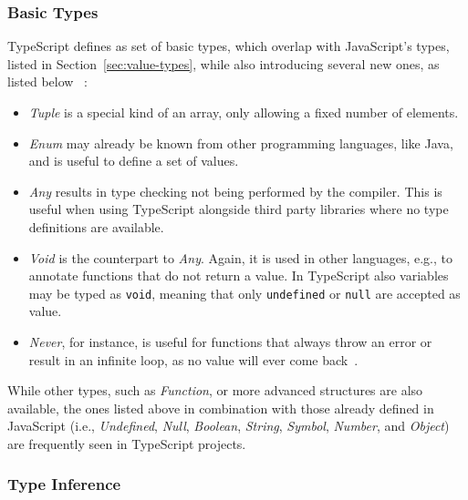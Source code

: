 \subsubsection{Basic Types}

TypeScript defines as set of basic types, which overlap with JavaScript's types, listed in Section~\ref{sec:value-types}, while also introducing several new ones, as listed below ~\cite{TypeScriptHandbook:BasicTypes}:
\begin{itemize}
  \item \emph{Tuple} is a special kind of an array, only allowing a fixed number of elements.
  \item \emph{Enum} may already be known from other programming languages, like Java, and is useful to define a set of values.
  \item \emph{Any} results in type checking not being performed by the compiler. This is useful when using TypeScript alongside third party libraries where no type definitions are available.
  \item \emph{Void} is the counterpart to \emph{Any}. Again, it is used in other languages, e.g., to annotate functions that do not return a value. In TypeScript also variables may be typed as \texttt{void}, meaning that only \texttt{undefined} or \texttt{null} are accepted as value.
  \item \emph{Never}, for instance, is useful for functions that always throw an error or result in an infinite loop, as no value will ever come back~\cite{TypeScriptHandbook:BasicTypes}.
\end{itemize}
While other types, such as \emph{Function}, or more advanced structures are also available, the ones listed above in combination with those already defined in JavaScript (i.e., \emph{Undefined}, \emph{Null}, \emph{Boolean}, \emph{String}, \emph{Symbol}, \emph{Number}, and \emph{Object}) are frequently seen in TypeScript projects.

\subsubsection{Type Inference}

